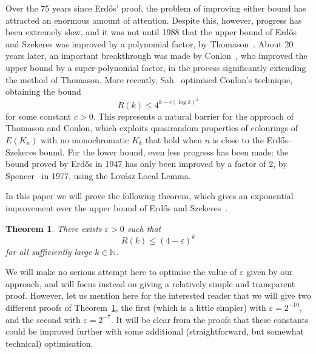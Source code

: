 \documentclass[12pt,reqno]{amsart}
\newtheorem{theorem}{Theorem}[section]
\theoremstyle{definition}
\theoremstyle{remark}
\newcommand\N{\mathbb{N}}
\newcommand\eps{\varepsilon}
\renewcommand{\le}{\leqslant}
\def\eps{\varepsilon}
\def\N{\mathbb{N}}
\begin{document}
Over the 75 years since Erd\H{o}s' proof, the problem of improving either bound has attracted an enormous amount of attention. Despite this, however, progress has been extremely slow, and it was not until 1988 that the upper bound of Erd\H{o}s and Szekeres was improved by a polynomial factor, by Thomason~\cite{T88}. About 20 years later, an important breakthrough was made by Conlon~\cite{C09}, who improved the upper bound by a super-polynomial factor, in the process significantly extending the method of Thomason. More recently, Sah~\cite{S23} optimised Conlon's technique, obtaining the bound
$$R(k) \le 4^{k - c(\log k)^2}$$
for some constant $c > 0$. This represents a natural barrier for the approach of Thomason and Conlon, which exploits quasirandom properties of colourings of $E(K_n)$ with no monochromatic $K_k$ that hold when $n$ is close to the Erd\H{o}s--Szekeres bound. For the lower bound, even less progress has been made: the bound proved by Erd\H{o}s in 1947 has only been improved by a factor of $2$, by Spencer~\cite{S77} in 1977, using the Lovász Local Lemma.  


In this paper we will prove the following theorem, which gives an exponential improvement over the upper bound of Erd\H{o}s and Szekeres~\cite{ESz35}. 
 
\begin{theorem}\label{thm:diagonal}
There exists $\eps > 0$ such that 
$$R(k) \le (4 - \eps)^k$$ 
for all sufficiently large $k \in \N$. 
\end{theorem}

We will make no serious attempt here to optimise the value of $\eps$ given by our approach, and will focus instead on giving a relatively simple and transparent proof. However, let us mention here for the interested reader that we will give two different proofs of Theorem~\ref{thm:diagonal}, the first (which is a little simpler) with $\eps = 2^{-10}$, and the second with $\eps = 2^{-7}$. It will be clear from the proofs that these constants could be improved further with some additional (straightforward, but somewhat technical)  optimisation. 

\end{document}
